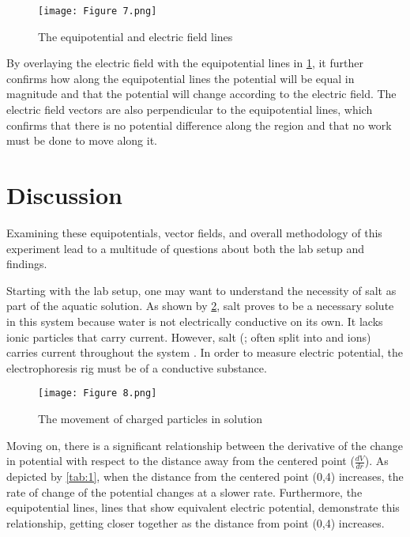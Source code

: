 \documentclass[10pt,journal,twoside]{IEEEtran}
\begin{document}
\begin{figure}
\begin{center}
\texttt{[image: Figure 7.png]}
\end{center}
\caption{The equipotential and electric field lines}
\label{fig:7}
\end{figure}
By overlaying the electric field with the equipotential lines in \cref{fig:7}, it further confirms how along the equipotential lines the potential will be equal in magnitude and that the potential will change according to the electric field. The electric field vectors are also perpendicular to the equipotential lines, which confirms that there is no potential difference along the region and that no work must be done to move along it. 






\section{Discussion}
Examining these equipotentials, vector fields, and overall methodology of this experiment lead to a multitude of questions about both the lab setup and findings. 

Starting with the lab setup, one may want to understand the necessity of salt as part of the aquatic solution. As shown by \cref{fig:8}, salt proves to be a necessary solute in this system because water is not electrically conductive on its own. It lacks ionic particles that carry current. However, salt (; often split into  and  ions) carries current throughout the system \cite{campbell}. In order to measure electric potential, the electrophoresis rig must be of a conductive substance. 
\begin{figure}
\begin{center}
\texttt{[image: Figure 8.png]}
\end{center}
\caption{The movement of charged  particles in solution}
\label{fig:8}
\end{figure}

Moving on, there is a significant relationship between the derivative of the change in potential with respect to the distance away from the centered point ($\frac{dV}{dr}$). As depicted by \cref{tab:1}, when the distance from the centered point (0,4) increases, the rate of change of the potential changes at a slower rate. Furthermore, the equipotential lines, lines that show equivalent electric potential, demonstrate this relationship, getting closer together as the distance from point (0,4) increases.
\end{document}
